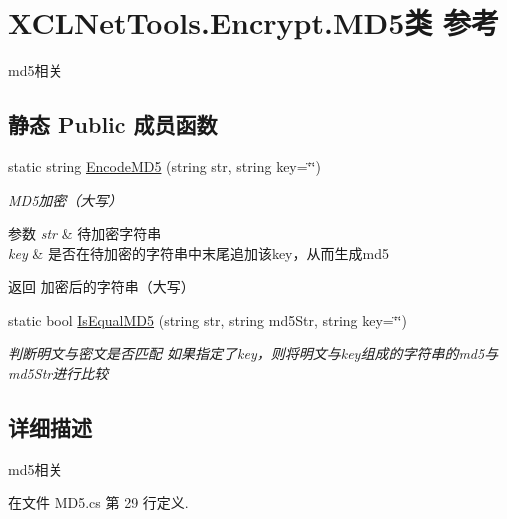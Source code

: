 \hypertarget{class_x_c_l_net_tools_1_1_encrypt_1_1_m_d5}{\section{X\-C\-L\-Net\-Tools.\-Encrypt.\-M\-D5类 参考}
\label{class_x_c_l_net_tools_1_1_encrypt_1_1_m_d5}
}


md5相关  


\subsection*{静态 Public 成员函数}
\begin{DoxyCompactItemize}
\item 
static string \hyperlink{class_x_c_l_net_tools_1_1_encrypt_1_1_m_d5_a146cf118c47e0693f82119d39f4b7ef1}{Encode\-M\-D5} (string str, string key=\char`\"{}\char`\"{})
\begin{DoxyCompactList}\small\item\em M\-D5加密（大写） 
\begin{DoxyParams}{参数}
{\em str} & 待加密字符串\\
\hline
{\em key} & 是否在待加密的字符串中末尾追加该key，从而生成md5\\
\hline
\end{DoxyParams}
\begin{DoxyReturn}{返回}
加密后的字符串（大写）
\end{DoxyReturn}
\end{DoxyCompactList}\item 
static bool \hyperlink{class_x_c_l_net_tools_1_1_encrypt_1_1_m_d5_a47f3bda0226d74bd2c9823a023ed8ed5}{Is\-Equal\-M\-D5} (string str, string md5\-Str, string key=\char`\"{}\char`\"{})
\begin{DoxyCompactList}\small\item\em 判断明文与密文是否匹配 如果指定了key，则将明文与key组成的字符串的md5与md5\-Str进行比较 \end{DoxyCompactList}\end{DoxyCompactItemize}


\subsection{详细描述}
md5相关 



在文件 M\-D5.\-cs 第 29 行定义.



